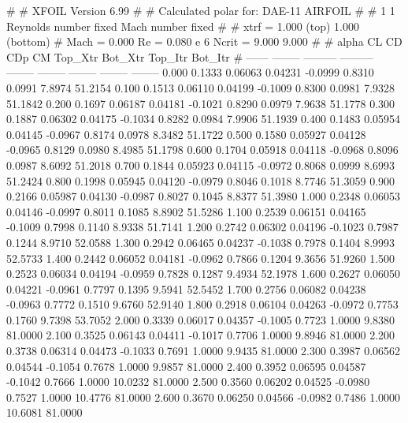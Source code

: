 #  
#       XFOIL         Version 6.99
#  
# Calculated polar for: DAE-11 AIRFOIL                                  
#  
# 1 1 Reynolds number fixed          Mach number fixed         
#  
# xtrf =   1.000 (top)        1.000 (bottom)  
# Mach =   0.000     Re =     0.080 e 6     Ncrit =   9.000  9.000
#  
#   alpha    CL        CD       CDp       CM     Top_Xtr  Bot_Xtr  Top_Itr  Bot_Itr
#  ------ -------- --------- --------- -------- -------- -------- -------- --------
   0.000   0.1333   0.06063   0.04231  -0.0999   0.8310   0.0991   7.8974  51.2154
   0.100   0.1513   0.06110   0.04199  -0.1009   0.8300   0.0981   7.9328  51.1842
   0.200   0.1697   0.06187   0.04181  -0.1021   0.8290   0.0979   7.9638  51.1778
   0.300   0.1887   0.06302   0.04175  -0.1034   0.8282   0.0984   7.9906  51.1939
   0.400   0.1483   0.05954   0.04145  -0.0967   0.8174   0.0978   8.3482  51.1722
   0.500   0.1580   0.05927   0.04128  -0.0965   0.8129   0.0980   8.4985  51.1798
   0.600   0.1704   0.05918   0.04118  -0.0968   0.8096   0.0987   8.6092  51.2018
   0.700   0.1844   0.05923   0.04115  -0.0972   0.8068   0.0999   8.6993  51.2424
   0.800   0.1998   0.05945   0.04120  -0.0979   0.8046   0.1018   8.7746  51.3059
   0.900   0.2166   0.05987   0.04130  -0.0987   0.8027   0.1045   8.8377  51.3980
   1.000   0.2348   0.06053   0.04146  -0.0997   0.8011   0.1085   8.8902  51.5286
   1.100   0.2539   0.06151   0.04165  -0.1009   0.7998   0.1140   8.9338  51.7141
   1.200   0.2742   0.06302   0.04196  -0.1023   0.7987   0.1244   8.9710  52.0588
   1.300   0.2942   0.06465   0.04237  -0.1038   0.7978   0.1404   8.9993  52.5733
   1.400   0.2442   0.06052   0.04181  -0.0962   0.7866   0.1204   9.3656  51.9260
   1.500   0.2523   0.06034   0.04194  -0.0959   0.7828   0.1287   9.4934  52.1978
   1.600   0.2627   0.06050   0.04221  -0.0961   0.7797   0.1395   9.5941  52.5452
   1.700   0.2756   0.06082   0.04238  -0.0963   0.7772   0.1510   9.6760  52.9140
   1.800   0.2918   0.06104   0.04263  -0.0972   0.7753   0.1760   9.7398  53.7052
   2.000   0.3339   0.06017   0.04357  -0.1005   0.7723   1.0000   9.8380  81.0000
   2.100   0.3525   0.06143   0.04411  -0.1017   0.7706   1.0000   9.8946  81.0000
   2.200   0.3738   0.06314   0.04473  -0.1033   0.7691   1.0000   9.9435  81.0000
   2.300   0.3987   0.06562   0.04544  -0.1054   0.7678   1.0000   9.9857  81.0000
   2.400   0.3952   0.06595   0.04587  -0.1042   0.7666   1.0000  10.0232  81.0000
   2.500   0.3560   0.06202   0.04525  -0.0980   0.7527   1.0000  10.4776  81.0000
   2.600   0.3670   0.06250   0.04566  -0.0982   0.7486   1.0000  10.6081  81.0000
